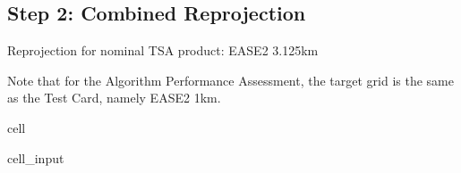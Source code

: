 \documentclass[letterpaper,10pt,english]{jupyterBook}
\begin{document}
\subsection{Step 2: Combined Reprojection}
\label{\detokenize{algorithm/CIMR_L2_TSA_PICASSO:step-2-combined-reprojection}}
\sphinxAtStartPar
Reprojection for nominal TSA product: EASE2 3.125km

\sphinxAtStartPar
Note that for the Algorithm Performance Assessment, the target grid is the same as the Test Card, namely EASE2 1km.

\begin{sphinxuseclass}{cell}\begin{sphinxVerbatimInput}

\begin{sphinxuseclass}{cell_input}
\begin{sphinxVerbatim}[commandchars=\\\{\}]
  

  
\end{sphinxVerbatim}

\end{sphinxuseclass}\end{sphinxVerbatimInput}

\end{sphinxuseclass}
\end{document}
